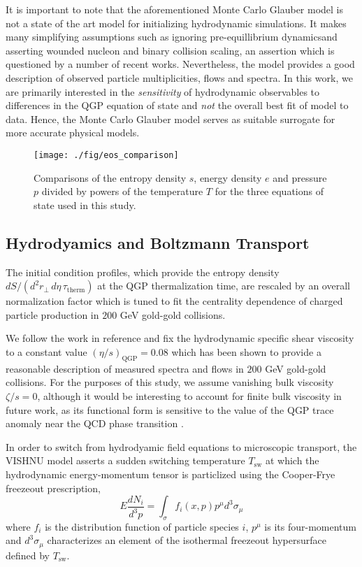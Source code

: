 \documentclass[aps,prc,reprint,amsmath,nofootinbib,superscriptaddress]{revtex4-1}
\begin{document}
It is important to note that the aforementioned Monte Carlo Glauber model is not a state of the art model for initializing hydrodynamic simulations. It 
makes many simplifying assumptions such as ignoring pre-equillibrium dynamicsand asserting wounded nucleon and binary collision scaling, an assertion 
which is questioned by a number of recent works. Nevertheless, the model provides a good description of observed particle multiplicities, flows and spectra. 
In this work, we are primarily interested in the \emph{sensitivity} of hydrodynamic observables to differences in the QGP equation of state and \emph{not} 
the overall best fit of model to data. Hence, the Monte Carlo Glauber model serves as suitable surrogate for more accurate physical models.

\begin{figure}[t]
  \texttt{[image: ./fig/eos\_comparison]}
  \caption{\label{fig:eos} Comparisons of the entropy density $s$, energy density $e$ and pressure $p$ divided by powers of the temperature $T$ for the 
	   three equations of state used in this study.}
\end{figure}

\subsection{Hydrodyamics and Boltzmann Transport}

The initial condition profiles, which provide the entropy density $dS/(d^2r_\perp\, d\eta\, \tau_\text{therm})$ at the QGP thermalization time, are rescaled
by an overall normalization factor which is tuned to fit the centrality dependence of charged particle production in $200$ GeV gold-gold collisions.

We follow the work in reference \cite{?} and fix the hydrodynamic specific shear viscosity to a constant value $(\eta/s)_\text{QGP}=0.08$ which has been shown to
provide a reasonable description of measured spectra and flows in $200$ GeV gold-gold collisions. For the purposes of this study, we assume vanishing bulk viscosity 
$\zeta/s=0$, although it would be interesting to account for finite bulk viscosity in future work, as its functional form is sensitive to the value of the QGP trace 
anomaly near the QCD phase transition \cite{?}.

In order to switch from hydrodyamic field equations to microscopic transport, the VISHNU model asserts a sudden switching temperature $T_\text{sw}$ at which the 
hydrodynamic energy-momentum tensor is particlized using the Cooper-Frye freezeout prescription,
\begin{equation}
 E\frac{dN_i}{d^3p} = \int_\sigma f_i(x,p) p^\mu d^3\sigma_\mu
 \label{cooper-frye}
\end{equation}
where $f_i$ is the distribution function of particle species $i$, $p^\mu$ is its four-momentum and $d^3\sigma_\mu$ characterizes an element of the isothermal 
freezeout hypersurface defined by $T_\text{sw}$.
\end{document}
